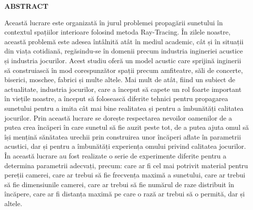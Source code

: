 	\thispagestyle{empty}
	\begin{center}
		\bf{ABSTRACT}
	\end{center}
	
	
	Această lucrare este organizată în jurul problemei propagării sunetului în contextul spațiilor interioare folosind metoda Ray-Tracing. În zilele noastre, această problemă este adesea întâlnită atât în mediul academic, cât
	și în situații din viața cotidiană, regăsindu-se în domenii precum industria ingineriei acustice și industria jocurilor. Acest studiu oferă un model acustic care sprijină inginerii să construiască în mod corespunzător spații precum amfiteatre, săli de concerte, biserici, moschee, fabrici și multe altele. Mai mult de atât, fiind un subiect de actualitate, industria jocurilor, care a început să capete un rol foarte important în viețile noastre, a început să folosească diferite tehnici pentru propagarea sunetului pentru a imita cât mai bine realitatea și pentru a îmbunătăți calitatea jocurilor. Prin această lucrare se dorește respectarea nevoilor oamenilor de a putea crea încăperi în care sunetul să fie auzit peste tot, de a putea ajuta omul să își mențină sănătatea urechii prin construirea unor încăperi aflate în parametrii acustici, dar și pentru a îmbunătăți experiența omului privind calitatea jocurilor. În această lucrare au fost realizate o serie de experimente diferite pentru a determina parametrii adecvați, precum: care ar fi cel mai potrivit material pentru pereții camerei, care ar trebui să fie frecvența maximă a sunetului, care ar trebui să fie dimensiunile camerei, care ar trebui să fie numărul de raze distribuit în încăpere, care ar fi distanța maximă pe care o rază ar trebui să o permită, dar și altele.
